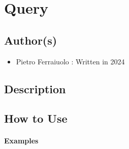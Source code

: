 \documentclass[letterpaper,10pt,english]{sphinxmanual}
\begin{document}
\sphinxstepscope


\chapter{Query}
\label{\detokenize{query:module-ggcas.query}}\label{\detokenize{query:query}}\label{\detokenize{query::doc}}

\section{Author(s)}
\label{\detokenize{query:author-s}}\begin{itemize}
\item {} 
\sphinxAtStartPar
Pietro Ferraiuolo : Written in 2024

\end{itemize}


\section{Description}
\label{\detokenize{query:description}}

\section{How to Use}
\label{\detokenize{query:how-to-use}}\subsubsection*{Examples}
\end{document}
